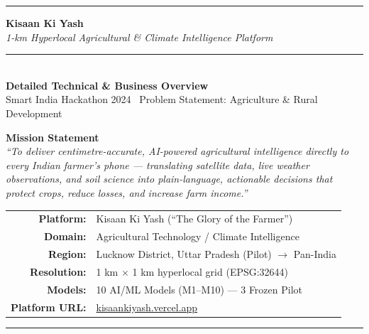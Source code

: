 \documentclass[12pt,a4paper]{article}
\begin{document}

\begin{titlepage}
\pagecolor{lightBg}
\centering
\vspace*{2cm}

{\color{primaryGreen}\rule{\linewidth}{2pt}}
\vspace{0.6cm}

{\Huge\bfseries\color{primaryGreen} Kisaan Ki Yash}\\[0.4cm]
{\large\color{deepTeal}\itshape 1-km Hyperlocal Agricultural \& Climate Intelligence Platform}\\[0.3cm]
{\color{sectionBar}\rule{0.5\linewidth}{1pt}}\\[0.8cm]

{\large\bfseries\color{textDark} Detailed Technical \& Business Overview}\\[0.2cm]
{\normalsize\color{gray} Smart India Hackathon 2024 \textemdash\ Problem Statement: Agriculture \& Rural Development}

\vspace{1.5cm}

\begin{tcolorbox}[colback=cardBg,colframe=primaryGreen,arc=8pt,boxrule=1.5pt,width=0.82\linewidth,center]
\centering
\textbf{\color{primaryGreen}Mission Statement}\\[6pt]
\color{textDark}\itshape
``To deliver centimetre-accurate, AI-powered agricultural intelligence directly to every Indian farmer's phone --- translating satellite data, live weather observations, and soil science into plain-language, actionable decisions that protect crops, reduce losses, and increase farm income.''
\end{tcolorbox}

\vspace{1.5cm}

\begin{tabular}{rl}
\textbf{\color{primaryGreen}Platform:}   & Kisaan Ki Yash (``The Glory of the Farmer'') \\
\textbf{\color{primaryGreen}Domain:}     & Agricultural Technology / Climate Intelligence \\
\textbf{\color{primaryGreen}Region:}     & Lucknow District, Uttar Pradesh (Pilot) $\rightarrow$ Pan-India \\
\textbf{\color{primaryGreen}Resolution:} & 1 km $\times$ 1 km hyperlocal grid (EPSG:32644) \\
\textbf{\color{primaryGreen}Models:}     & 10 AI/ML Models (M1--M10) --- 3 Frozen Pilot \\
\textbf{\color{primaryGreen}Platform URL:} & \href{https://kisaankiyash.vercel.app}{kisaankiyash.vercel.app} \\
\end{tabular}

\vfill

{\color{primaryGreen}\rule{\linewidth}{2pt}}
\end{titlepage}
\end{document}
